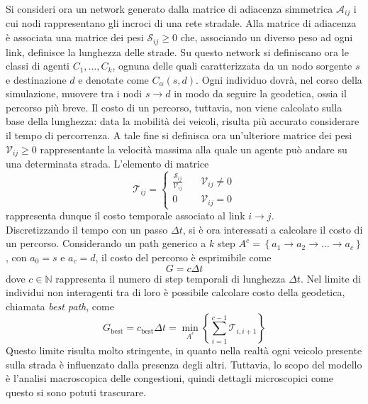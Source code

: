 \documentclass[../main.tex]{subfiles}
\begin{document}
Si consideri ora un network generato dalla matrice di adiacenza simmetrica $\mathcal{A}_{ij}$ i cui nodi rappresentano gli incroci di una rete stradale.
Alla matrice di adiacenza \`e associata una matrice dei pesi $\mathcal{S}_{ij} \geq 0$ che, associando un diverso peso ad ogni link, definisce la lunghezza delle strade.
Su questo network si definiscano ora le classi di agenti $C_{1},\ldots,C_{k}$, ognuna delle quali caratterizzata da un nodo sorgente $s$ e destinazione $d$ e denotate come $C_{\alpha}(s,d)$.
Ogni individuo dovr\`a, nel corso della simulazione, muovere tra i nodi $s\to d$ in modo da seguire la geodetica, ossia il percorso pi\`u breve.
Il costo di un percorso, tuttavia, non viene calcolato sulla base della lunghezza: data la mobilit\`a dei veicoli, risulta pi\`u accurato considerare il tempo di percorrenza.
A tale fine si definisca ora un'ulteriore matrice dei pesi $\mathcal{V}_{ij} \geq 0$ rappresentante la velocit\`a massima alla quale un agente pu\`o andare su una determinata strada.
L'elemento di matrice
\begin{equation}
    \mathcal{T}_{ij}=
    \begin{cases}
        \frac{\mathcal{S}_{ij}}{\mathcal{V}_{ij}} \quad& \mathcal{V}_{ij} \neq 0\\
        0 \quad& \mathcal{V}_{ij} = 0
    \end{cases}
\end{equation}
rappresenta dunque il costo temporale associato al link $i \to j$.\\
Discretizzando il tempo con un passo $\Delta t$, si \`e ora interessati a calcolare il costo di un percorso.
Considerando un path generico a $k$ step $A^{c} = \left\{a_{1} \to a_{2} \to \ldots \to a_{c}\right\}$, con $a_{0} = s$ e $a_{c} = d$, il costo del percorso \`e esprimibile come
\begin{equation}
    G=c\Delta t
\end{equation}
dove $c \in \mathbb{N}$ rappresenta il numero di step temporali di lunghezza $\Delta t$.
Nel limite di individui non interagenti tra di loro \`e possibile calcolare costo della geodetica, chiamata \emph{best path}, come
\begin{equation}
    G_{\text{best}} = c_{\text{best}}\Delta t = \min_{A^{c}} \left\{\sum_{i=1}^{c-1}\mathcal{T}_{i,i+1}\right\}
    \label{eq:best_path}
\end{equation}
Questo limite risulta molto stringente, in quanto nella realt\`a ogni veicolo presente sulla strada \`e influenzato dalla presenza degli altri.
Tuttavia, lo scopo del modello \`e l'analisi macroscopica delle congestioni, quindi dettagli microscopici come questo si sono potuti trascurare.
\end{document}
